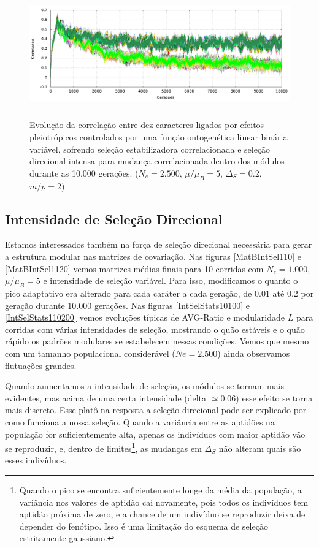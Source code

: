 \begin{figure}[htbp]
    \centering
    \includegraphics[width=150mm, height=55mm]{figuras/direcionalRMu5Ne2500IntSel200.png}
    \caption{Evolução da correlação entre dez caracteres ligados por efeitos
        pleiotrópicos controlados por uma função ontogenética linear binária
        variável, sofrendo seleção estabilizadora correlacionada
        e seleção direcional intensa para mudança correlacionada dentro dos
        módulos durante as 10.000 gerações. 
    ($N_e = 2.500$, $\mu/\mu_B=5$, $\Delta_S=0.2$, $m/p=2$)}
    \label{MatBDirecionalNe2500RMu5}
\end{figure}

\subsection{Intensidade de Seleção Direcional}

Estamos interessados também na força de seleção direcional necessária
para gerar a estrutura modular nas matrizes de covariação. 
Nas figuras \ref{MatBIntSel110} e \ref{MatBIntSel1120} vemos matrizes
médias finais para 10 corridas com $N_e = 1.000$, $\mu/\mu_B=5$ e
intensidade de seleção variável. 
Para isso, modificamos o quanto o pico adaptativo era alterado para cada
caráter a cada geração, de $0.01$ até $0.2$ por geração durante 10.000
gerações. 
Nas figuras \ref{IntSelStats10100} e \ref{IntSelStats110200} vemos
evoluções típicas de AVG-Ratio e modularidade $L$ para corridas com
várias intensidades de seleção, mostrando o quão estáveis e o quão
rápido os padrões modulares se estabelecem nessas condições.
Vemos que mesmo com um tamanho populacional considerável ($Ne = 2.500$)
ainda observamos flutuações grandes. 

Quando aumentamos a intensidade de seleção, os módulos se tornam
mais evidentes, mas acima de uma certa intensidade (delta $\simeq 0.06$)
esse efeito se torna mais discreto. 
Esse platô na resposta a seleção direcional pode ser explicado por como
funciona a nossa seleção. 
Quando a variância entre as aptidões na população for suficientemente
alta, apenas os indivíduos com maior aptidão vão se reproduzir, e,
dentro de limites\footnote{ Quando o pico se encontra suficientemente
    longe da média da população, a variância nos valores de aptidão cai
    novamente, pois todos os indivíduos tem aptidão próxima de zero, e a
    chance de um indivíduo se reproduzir deixa de depender do fenótipo. 
Isso é uma limitação do esquema de seleção estritamente gaussiano.}, as
mudanças em $\Delta_S$ não alteram quais são esses indivíduos. 


